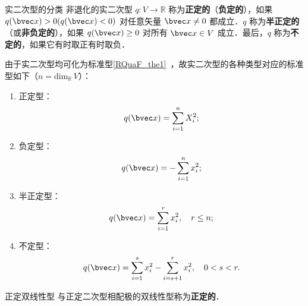 \begin{definition}{实二次型的分类}
非退化的实二次型 $q:V\rightarrow\mathbb R$ 称为\textbf{正定的}（\textbf{负定的}），如果 $q(\bvec x)>0(q(\bvec x)<0)$ 对任意矢量 $\bvec x\neq0$ 都成立．$q$ 称为\textbf{半正定的}（或\textbf{非负定的}），如果 $q(\bvec x)\geq0$ 对所有 $\bvec x\in V$ 成立．最后，$q$ 称为\textbf{不定的}，如果它有时取正有时取负．
\end{definition}
由于实二次型均可化为标准型\autoref{RQuaF_the1}~，故实二次型的各种类型对应的标准型如下（$n=\mathrm{dim}_\mathbb R \,V$）：
\begin{enumerate}
\item 正定型：\begin{equation}
q(\bvec x)=\sum_{i=1}^n X_i^2;
\end{equation}
\item 负定型：\begin{equation}
q(\bvec x)=-\sum_{i=1}^n x_i^2;
\end{equation}
\item 半正定型：\begin{equation}
q(\bvec x)=\sum_{i=1}^r x_i^2,\quad r\leq n;
\end{equation}
\item 不定型：\begin{equation}
q(\bvec x)=\sum_{i=1}^s x_i^2-\sum_{i=s+1}^r x_i^2,\quad0<s< r.
\end{equation}
\end{enumerate}
\begin{definition}{正定双线性型}
与正定二次型相配极的双线性型称为\textbf{正定的}．
\end{definition}